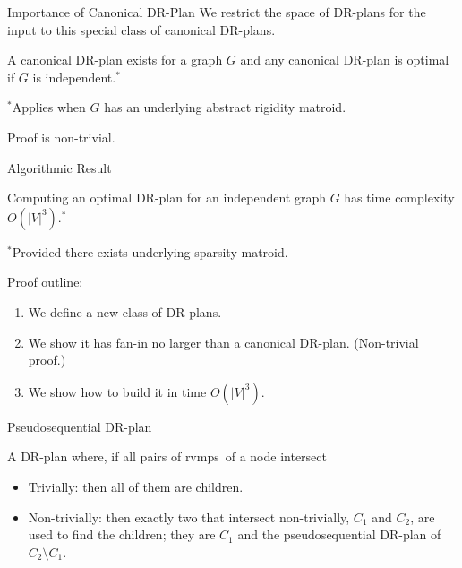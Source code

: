 \documentclass{mySlides}
\newcommand{\n}{\vspace{1em}}
\newcommand{\rvmps}{rvmps}
\begin{document}
\begin{frame}{Importance of Canonical DR-Plan}
    We restrict the space of DR-plans for the input to this special class of canonical DR-plans.

    \n

    \begin{theorem}
        A canonical DR-plan exists for a graph $G$ and any canonical DR-plan is optimal if $G$ is independent.$^*$
    \end{theorem}
    $^*$Applies when $G$ has an underlying abstract rigidity matroid.

    \n

    Proof is non-trivial.
\end{frame}

\begin{frame}{Algorithmic Result}
    \begin{theorem}
        Computing an optimal DR-plan for an independent graph $G$ has time complexity $O(|V|^3)$.$^*$
    \end{theorem}
    $^*$Provided there exists underlying sparsity matroid.



    \pause
    \n

    Proof outline:
    \begin{enumerate}
        \item We define a new class of DR-plans.
        \item We show it has fan-in no larger than a canonical DR-plan. (Non-trivial proof.)
        \item We show how to build it in time $O(|V|^3)$.
    \end{enumerate}
\end{frame}

\begin{frame}{Pseudosequential DR-plan}
    \begin{definition}
        A DR-plan where, if all pairs of \rvmps\ of a node intersect
        \begin{itemize}
            \item Trivially: then all of them are children.
            \item Non-trivially: then exactly two that intersect non-trivially, $C_1$ and $C_2$, are used to find the children; they are $C_1$ and the pseudosequential DR-plan of $C_2\setminus C_1$.
        \end{itemize}
    \end{definition}
\end{frame}
\end{document}
